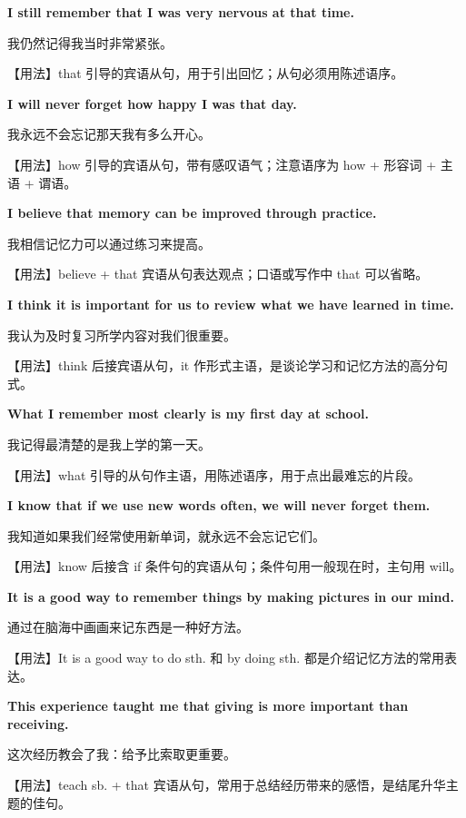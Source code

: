 \documentclass[UTF8,a4paper,11pt,oneside]{ctexbook}
\newcommand{\fansection}[1]{%
  \par\addvspace{2.4ex}%
  \Needspace{6\baselineskip}%
  \noindent{\sffamily\Large\bfseries\color{mainblue}#1}\par
  \nopagebreak
  \addvspace{0.2ex}%
  \noindent{\color{rulelight}\rule{\linewidth}{0.9pt}}\par
  \addvspace{0.9ex}%
  \nobreak
}
\newcommand{\fanpat}[3]{%
  \item{\bfseries #1}\par\nopagebreak
  {\small\color{textgray}#2}\par\nopagebreak
  {\footnotesize\color{accent!90!black}【用法】#3}\par
}
\begin{document}
\fansection{〇、本单元写作常用句型}
\begin{fanpatterns}

\fanpat{I still remember that I was very nervous at that time.}{我仍然记得我当时非常紧张。}{that 引导的宾语从句，用于引出回忆；从句必须用陈述语序。}

\fanpat{I will never forget how happy I was that day.}{我永远不会忘记那天我有多么开心。}{how 引导的宾语从句，带有感叹语气；注意语序为 how + 形容词 + 主语 + 谓语。}

\fanpat{I believe that memory can be improved through practice.}{我相信记忆力可以通过练习来提高。}{believe + that 宾语从句表达观点；口语或写作中 that 可以省略。}

\fanpat{I think it is important for us to review what we have learned in time.}{我认为及时复习所学内容对我们很重要。}{think 后接宾语从句，it 作形式主语，是谈论学习和记忆方法的高分句式。}

\fanpat{What I remember most clearly is my first day at school.}{我记得最清楚的是我上学的第一天。}{what 引导的从句作主语，用陈述语序，用于点出最难忘的片段。}

\fanpat{I know that if we use new words often, we will never forget them.}{我知道如果我们经常使用新单词，就永远不会忘记它们。}{know 后接含 if 条件句的宾语从句；条件句用一般现在时，主句用 will。}

\fanpat{It is a good way to remember things by making pictures in our mind.}{通过在脑海中画画来记东西是一种好方法。}{It is a good way to do sth. 和 by doing sth. 都是介绍记忆方法的常用表达。}

\fanpat{This experience taught me that giving is more important than receiving.}{这次经历教会了我：给予比索取更重要。}{teach sb. + that 宾语从句，常用于总结经历带来的感悟，是结尾升华主题的佳句。}

\end{fanpatterns}

\fansection{一、满分范文}
\end{document}
